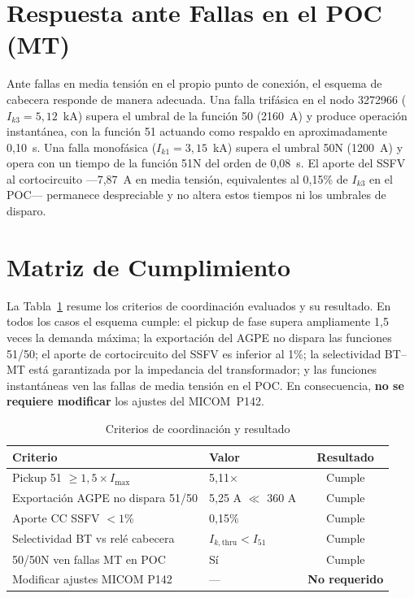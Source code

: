 \section{Respuesta ante Fallas en el POC (MT)}

Ante fallas en media tensión en el propio punto de conexión, el esquema de cabecera responde de manera adecuada. Una falla trifásica en el nodo 3272966 ($I_{k3}=5{,}12$~kA) supera el umbral de la función 50 (2160~A) y produce operación instantánea, con la función 51 actuando como respaldo en aproximadamente 0,10~s. Una falla monofásica ($I_{k1}=3{,}15$~kA) supera el umbral 50N (1200~A) y opera con un tiempo de la función 51N del orden de 0,08~s. El aporte del SSFV al cortocircuito ---7,87~A en media tensión, equivalentes al 0,15\% de $I_{k3}$ en el POC--- permanece despreciable y no altera estos tiempos ni los umbrales de disparo.

\section{Matriz de Cumplimiento}

La Tabla~\ref{tab:matriz_prot} resume los criterios de coordinación evaluados y su resultado. En todos los casos el esquema cumple: el pickup de fase supera ampliamente 1,5 veces la demanda máxima; la exportación del AGPE no dispara las funciones 51/50; el aporte de cortocircuito del SSFV es inferior al 1\%; la selectividad BT--MT está garantizada por la impedancia del transformador; y las funciones instantáneas ven las fallas de media tensión en el POC. En consecuencia, \textbf{no se requiere modificar} los ajustes del MICOM~P142.

\begin{table}[H]
    \centering
    \caption{Criterios de coordinación y resultado}
    \label{tab:matriz_prot}
    \begin{tabular}{llc}
    \toprule
    \textbf{Criterio} & \textbf{Valor} & \textbf{Resultado} \\
    \midrule
    Pickup 51 $\geq 1{,}5\times I_{\max}$ & 5,11$\times$ & Cumple \\
    Exportación AGPE no dispara 51/50 & 5,25 A $\ll$ 360 A & Cumple \\
    Aporte CC SSFV $< 1\%$ & 0,15\% & Cumple \\
    Selectividad BT vs relé cabecera & $I_{k,\mathrm{thru}}<I_{51}$ & Cumple \\
    50/50N ven fallas MT en POC & Sí & Cumple \\
    Modificar ajustes MICOM P142 & --- & \textbf{No requerido} \\
    \bottomrule
    \end{tabular}
\end{table}

